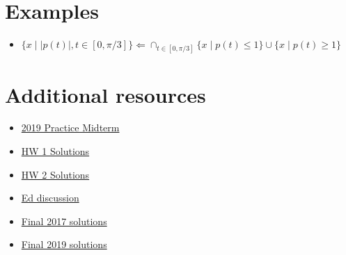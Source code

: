 \documentclass{article}
\newcommand{\abs}[1]{\lvert#1\rvert}
\begin{document}
\section{Examples}
\begin{itemize}
  \item $\{ x \mid \abs{p(t)}, t\in [0, \pi/3]\} \Leftarrow \cap_{t\in [0, \pi/3]} \{x \mid p(t) \leq 1\}\cup \{x \mid p(t) \geq 1\}$
\end{itemize}


\section{Additional resources}
\begin{itemize}
  \item \href{https://web.stanford.edu/class/ee364a/solutions/midterm_19_sol.pdf}{2019 Practice Midterm}
  \item \href{https://web.stanford.edu/class/ee364a/solutions/hw/2022_hw1sol.pdf}{HW 1 Solutions}
  \item \href{https://web.stanford.edu/class/ee364a/solutions/hw/2022_hw2sol.pdf}{HW 2 Solutions}
  \item \href{https://edstem.org/us/courses/16230/discussion/}{Ed discussion}
  \item \href{https://web.stanford.edu/class/ee364a/solutions/final_17_sol.pdf}{Final 2017 solutions}
  \item \href{https://web.stanford.edu/class/ee364a/solutions/final_19_sol.pdf}{Final 2019 solutions}
\end{itemize}
\end{document}
